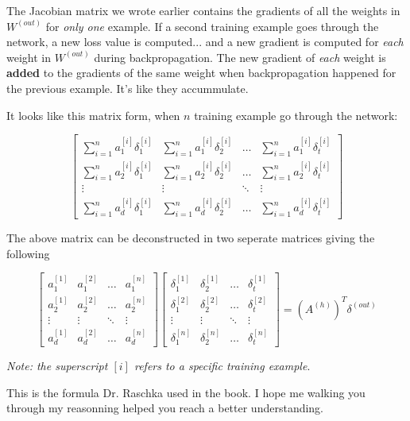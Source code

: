 \documentclass[../main.tex]{subfiles}
\begin{document}
The Jacobian matrix we wrote earlier contains the gradients of all the
weights in $W^{(out)}$ for \emph{only one} example. If a second training example goes 
through the network, a new loss value is computed...  and a new gradient is computed
for \emph{each} weight in $W^{(out)}$ during backpropagation. The new gradient of \emph{each} weight
is \textbf{added} to the gradients of the same weight when backpropagation happened for the previous example.
It's like they accummulate.

\vspace{5mm} %

It looks like this matrix form, when $n$ training example go through the network:

\[
    \begin{bmatrix}
        \sum_{i=1}^{n} a_1^{[i]}\delta_1^{[i]}  & \sum_{i=1}^{n} a_1^{[i]}\delta_2^{[i]} & \dots    & \sum_{i=1}^{n} a_1^{[i]}\delta_t^{[i]} \\
        \sum_{i=1}^{n} a_2^{[i]}\delta_1^{[i]}  & \sum_{i=1}^{n} a_2^{[i]}\delta_2^{[i]} & \dots    & \sum_{i=1}^{n} a_2^{[i]}\delta_t^{[i]} \\
        \vdots                                  & \vdots                                 & \ddots   & \vdots                                 \\
        \sum_{i=1}^{n} a_d^{[i]}\delta_1^{[i]}  & \sum_{i=1}^{n} a_d^{[i]}\delta_2^{[i]} & \dots    & \sum_{i=1}^{n} a_d^{[i]}\delta_t^{[i]}
    \end{bmatrix}
\]

\vspace{5mm} %

The above matrix can be deconstructed in two seperate matrices giving the following

\vspace{5mm} %

\[
    \begin{bmatrix}
        a_1^{[1]}   & a_1^{[2]} & \dots  & a_1^{[n]} \\
        a_2^{[1]}   & a_2^{[2]} & \dots  & a_2^{[n]} \\
        \vdots      & \vdots    & \ddots & \vdots    \\
        a_d^{[1]}   & a_d^{[2]} & \dots  & a_d^{[n]}
    \end{bmatrix}
    \begin{bmatrix}
        \delta_1^{[1]}   & \delta_2^{[1]} & \dots  & \delta_t^{[1]} \\
        \delta_1^{[2]}   & \delta_2^{[2]} & \dots  & \delta_t^{[2]} \\
        \vdots      & \vdots    & \ddots & \vdots    \\
        \delta_1^{[n]}   & \delta_2^{[n]} & \dots  & \delta_t^{[n]} 
    \end{bmatrix}
    =
    (A^{(h)})^T \delta^{(out)}
\]

\emph{Note: the superscript $[i]$ refers to a specific training example}.

\vspace{5mm} %

This is the formula Dr. Raschka used in the book. I hope me walking you through
my reasonning helped you reach a better understanding.
\end{document}
